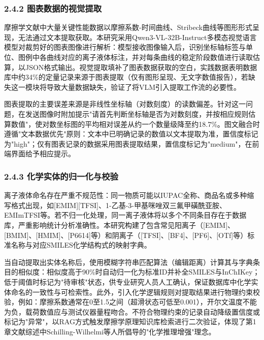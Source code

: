 \hypertarget{ux56feux8868ux6570ux636eux7684ux89c6ux89c9ux63d0ux53d6}{%
\subsubsection{2.4.2 图表数据的视觉提取}\label{ux56feux8868ux6570ux636eux7684ux89c6ux89c9ux63d0ux53d6}}

摩擦学文献中大量关键性能数据以摩擦系数-时间曲线、Stribeck曲线等图形形式呈现，无法通过文本提取获取。本研究采用Qwen3-VL-32B-Instruct多模态视觉语言模型对裁剪好的图表图像进行解析\cite{ref30}：模型接收图像输入后，识别坐标轴标签与单位、图例中各曲线对应的离子液体标注，并对每条曲线的稳定阶段数值进行读取估算，以JSON格式输出。视觉提取填补了图表数据获取的空白，实践数据表明数据库中约34\%的定量记录来源于图表提取（仅有图形呈现、无文字数值报告），若缺失这一模块将导致大量数据缺失，验证了将VLM引入提取工作流的必要性。

图表提取的主要误差来源是非线性坐标轴（对数刻度）的读数偏差。针对这一问题，在发送图像时附加提示"请首先判断坐标轴是否为对数刻度，并按相应规则估算数值"，使对数坐标图的平均相对误差从约一个数量级降至约18.7\%。图文融合时遵循"文本数据优先"原则：文本中已明确记录的数值以文本提取为准，置信度标记为"high"；仅有图表记录的数据采用图表提取结果，置信度标记为"medium"，在前端界面给予相应提示。

\hypertarget{ux5316ux5b66ux5b9eux4f53ux7684ux5f52ux4e00ux5316ux4e0eux6821ux9a8c}{%
\subsubsection{2.4.3 化学实体的归一化与校验}\label{ux5316ux5b66ux5b9eux4f53ux7684ux5f52ux4e00ux5316ux4e0eux6821ux9a8c}}

离子液体命名存在严重不规范性：同一物质可能以IUPAC全称、商品名或多种缩写格式出现，如{[}EMIM{]}{[}TFSI{]}、1-乙基-3-甲基咪唑双三氟甲磺酰亚胺、EMImTFSI等。若不归一化处理，同一离子液体将以多个不同条目存在于数据库，严重影响统计分析准确性。本研究构建了包含常见阳离子（{[}EMIM{]}、{[}BMIM{]}、{[}HMIM{]}、{[}P6614{]}等）和阴离子（{[}TFSI{]}、{[}BF4{]}、{[}PF6{]}、{[}OTf{]}等）标准名称与对应SMILES化学结构式的映射字典。

当自动提取出实体名称后，使用模糊字符串匹配算法（编辑距离）计算其与字典条目的相似度：相似度高于90\%时自动归一化为标准ID并补全SMILES与InChIKey；低于阈值时标记为"待审核"状态，供专业研究人员人工确认，保证数据库中化学实体命名的一致性与可检索性。此外，引入化学逻辑规则对提取结果进行物理约束校验，例如：摩擦系数通常在0至1.5之间（超滑状态可低至0.001），开尔文温度不能为负，载荷数值应与测试仪器量程吻合。不符合物理约束的记录自动降级置信度或标记为"异常"，以RAG方式触发摩擦学原理知识库检索进行二次验证，体现了第1章文献综述中Schilling-Wilhelmi等人\cite{ref17}所倡导的"化学推理增强"理念。

